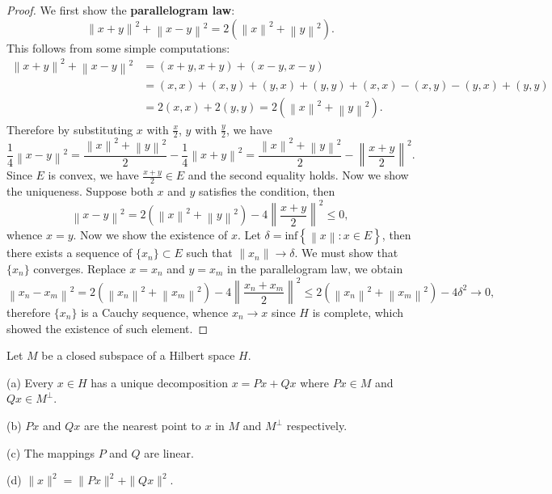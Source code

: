 \begin{proof}
We first show the \textbf{parallelogram law}: 
$$
\left\| x+y \right\| ^2+\left\| x-y \right\| ^2=2\left( \left\| x \right\| ^2+\left\| y \right\| ^2 \right) .
$$
This follows from some simple computations: 
$$
\begin{aligned}
\left\| x+y \right\| ^2+\left\| x-y \right\| ^2&=\left( x+y,x+y \right) +\left( x-y,x-y \right) 
\\
&=\left( x,x \right) +\left( x,y \right) +\left( y,x \right) +\left( y,y \right) +\left( x,x \right) -\left( x,y \right) -\left( y,x \right) +\left( y,y \right) 
\\
&=2\left( x,x \right) +2\left( y,y \right) =2\left( \left\| x \right\| ^2+\left\| y \right\| ^2 \right) .
\end{aligned}
$$
Therefore by substituting $x$ with $\frac{x}{2}$, $y$ with $\frac{y}{2}$, we have 
$$
\frac{1}{4}\left\| x-y \right\| ^2=\frac{\left\| x \right\| ^2+\left\| y \right\| ^2}{2}-\frac{1}{4}\left\| x+y \right\| ^2=\frac{\left\| x \right\| ^2+\left\| y \right\| ^2}{2}-\left\| \frac{x+y}{2} \right\| ^2.
$$
Since $E$ is convex, we have $\frac{x+y}{2}\in E$ and the second equality holds. Now we show the uniqueness. Suppose both $x$ and $y$ satisfies the condition, then 
$$
\left\| x-y \right\| ^2=2\left( \left\| x \right\| ^2+\left\| y \right\| ^2 \right) -4\left\| \frac{x+y}{2} \right\| ^2\le 0,
$$
whence $x=y$. Now we show the existence of $x$. Let $\delta =\mathrm{inf}\left\{ \left\| x \right\| :x\in E \right\} $, then there exists a sequence of $\{x_n\}\subset E$ such that $\|x_n\|\to \delta$. We must show that $\{x_n\}$ converges. Replace $x=x_n$ and $y=x_m$ in the parallelogram law, we obtain 
$$
\left\| x_n-x_m \right\| ^2=2\left( \left\| x_n \right\| ^2+\left\| x_m \right\| ^2 \right) -4\left\| \frac{x_n+x_m}{2} \right\| ^2\le 2\left( \left\| x_n \right\| ^2+\left\| x_m \right\| ^2 \right) -4\delta ^2\rightarrow 0,
$$
therefore $\{x_n\}$ is a Cauchy sequence, whence $x_n\to x$ since $H$ is complete, which showed the existence of such element.
\end{proof}
\begin{theorem}
Let $M$ be a closed subspace of a Hilbert space $H$.\par
(a) Every $x\in H$ has a unique decomposition $x=Px+Qx$ where $Px\in M$ and $Qx\in M^\perp$.\par
(b) $Px$ and $Qx$ are the nearest point to $x$ in $M$ and $M^\perp$ respectively.\par
(c) The mappings $P$ and $Q$ are linear.\par
(d) $\|x\|^2=\|Px\|^2+\|Qx\|^2$.
\end{theorem}
